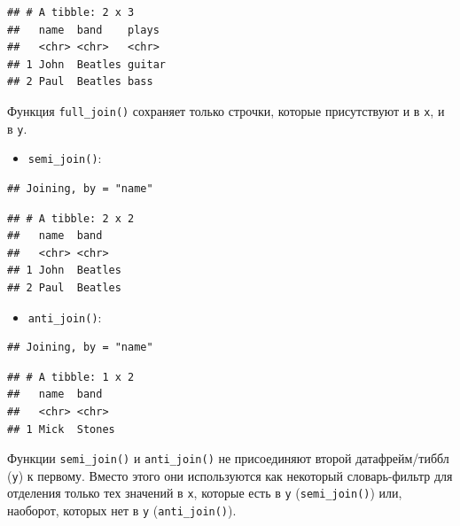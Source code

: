 \documentclass[]{book}
\newenvironment{Shaded}{\begin{snugshade}}{\end{snugshade}}
\newcommand{\KeywordTok}[1]{\textcolor[rgb]{0.13,0.29,0.53}{\textbf{#1}}}
\newcommand{\StringTok}[1]{\textcolor[rgb]{0.31,0.60,0.02}{#1}}
\newcommand{\OperatorTok}[1]{\textcolor[rgb]{0.81,0.36,0.00}{\textbf{#1}}}
\newcommand{\NormalTok}[1]{#1}
\providecommand{\tightlist}{%
  \setlength{\itemsep}{0pt}\setlength{\parskip}{0pt}}
\begin{document}
\begin{verbatim}
## # A tibble: 2 x 3
##   name  band    plays 
##   <chr> <chr>   <chr> 
## 1 John  Beatles guitar
## 2 Paul  Beatles bass
\end{verbatim}

Функция \texttt{full\_join()} сохраняет только строчки, которые
присутствуют и в \texttt{x}, и в \texttt{y}.

\begin{itemize}
\tightlist
\item
  \texttt{semi\_join()}:
\end{itemize}

\begin{Shaded}
\end{Shaded}

\begin{verbatim}
## Joining, by = "name"
\end{verbatim}

\begin{verbatim}
## # A tibble: 2 x 2
##   name  band   
##   <chr> <chr>  
## 1 John  Beatles
## 2 Paul  Beatles
\end{verbatim}

\begin{itemize}
\tightlist
\item
  \texttt{anti\_join()}:
\end{itemize}

\begin{Shaded}
\end{Shaded}

\begin{verbatim}
## Joining, by = "name"
\end{verbatim}

\begin{verbatim}
## # A tibble: 1 x 2
##   name  band  
##   <chr> <chr> 
## 1 Mick  Stones
\end{verbatim}

Функции \texttt{semi\_join()} и \texttt{anti\_join()} не присоединяют
второй датафрейм/тиббл (\texttt{y}) к первому. Вместо этого они
используются как некоторый словарь-фильтр для отделения только тех
значений в \texttt{x}, которые есть в \texttt{y} (\texttt{semi\_join()})
или, наоборот, которых нет в \texttt{y} (\texttt{anti\_join()}).
\end{document}
